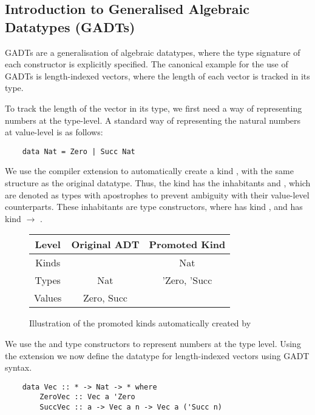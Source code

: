 \subsection{Introduction to Generalised Algebraic Datatypes (GADTs)}

GADTs are a generalisation of algebraic datatypes, where the type signature of each constructor is explicitly specified. The canonical example for the use of GADTs is length-indexed vectors, where the length of each vector is tracked in its type.

To track the length of the vector in its type, we first need a way of representing numbers at the type-level. A standard way of representing the natural numbers at value-level is as follows:

\begin{lstlisting}
    data Nat = Zero | Succ Nat
\end{lstlisting}

We use the  compiler extension to automatically create a kind , with the same structure as the original  datatype. Thus, the  kind has the inhabitants  and , which are denoted as types with apostrophes to prevent ambiguity with their value-level counterparts. These inhabitants are type constructors, where  has kind , and  has kind  $\rightarrow$ . 

\begin{figure}[h]
    \centering
    \begin{tabular}{ |c|c|c| } 
        \hline
        Level & Original ADT & Promoted Kind \\
        \hline 
        Kinds &  & Nat \\
        Types & Nat & 'Zero, 'Succ \\
        Values & Zero, Succ & \\
        \hline
    \end{tabular}
    \caption{Illustration of the promoted kinds automatically created by }
    \label{fig:datakindsPromotion}
\end{figure}

We use the  and  type constructors to represent numbers at the type level. Using the  extension we now define the datatype for length-indexed vectors using GADT syntax.

\begin{lstlisting}
    data Vec :: * -> Nat -> * where
        ZeroVec :: Vec a 'Zero
        SuccVec :: a -> Vec a n -> Vec a ('Succ n)
\end{lstlisting}

